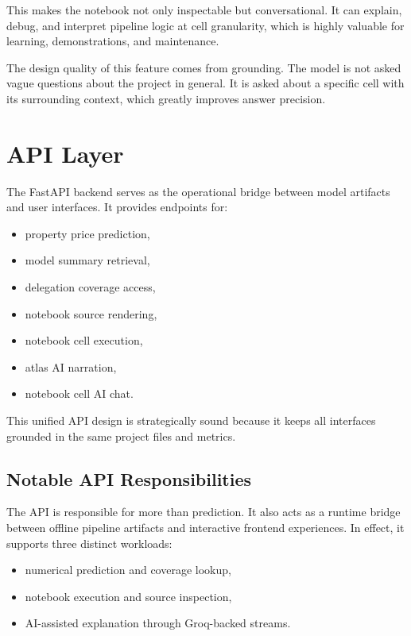 \documentclass[11pt,a4paper]{article}
\begin{document}
This makes the notebook not only inspectable but conversational. It can explain, debug, and interpret pipeline logic at cell granularity, which is highly valuable for learning, demonstrations, and maintenance.

The design quality of this feature comes from grounding. The model is not asked vague questions about the project in general. It is asked about a specific cell with its surrounding context, which greatly improves answer precision.

\section{API Layer}

The FastAPI backend serves as the operational bridge between model artifacts and user interfaces. It provides endpoints for:

\begin{itemize}
\item property price prediction,
\item model summary retrieval,
\item delegation coverage access,
\item notebook source rendering,
\item notebook cell execution,
\item atlas AI narration,
\item notebook cell AI chat.
\end{itemize}

This unified API design is strategically sound because it keeps all interfaces grounded in the same project files and metrics.

\subsection{Notable API Responsibilities}

The API is responsible for more than prediction. It also acts as a runtime bridge between offline pipeline artifacts and interactive frontend experiences. In effect, it supports three distinct workloads:

\begin{itemize}
\item numerical prediction and coverage lookup,
\item notebook execution and source inspection,
\item AI-assisted explanation through Groq-backed streams.
\end{itemize}
\end{document}
